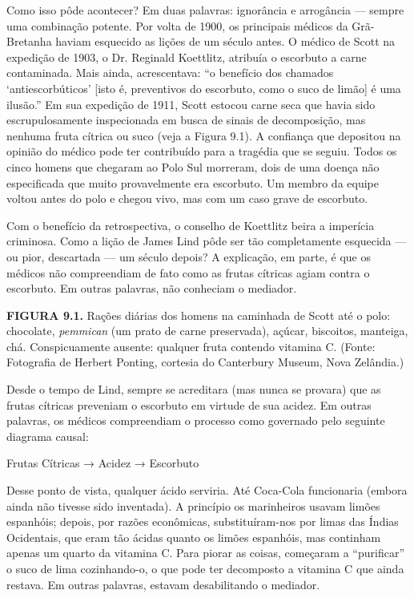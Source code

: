 \documentclass[11pt,a5paper,twoside]{book}
\begin{document}
Como isso pôde acontecer? Em duas palavras: ignorância e arrogância — sempre uma combinação potente. Por volta de 1900, os principais médicos da Grã-Bretanha haviam esquecido as lições de um século antes. O médico de Scott na expedição de 1903, o Dr. Reginald Koettlitz, atribuía o escorbuto a carne contaminada. Mais ainda, acrescentava: “o benefício dos chamados ‘antiescorbúticos’ [isto é, preventivos do escorbuto, como o suco de limão] é uma ilusão.” Em sua expedição de 1911, Scott estocou carne seca que havia sido escrupulosamente inspecionada em busca de sinais de decomposição, mas nenhuma fruta cítrica ou suco (veja a Figura 9.1). A confiança que depositou na opinião do médico pode ter contribuído para a tragédia que se seguiu. Todos os cinco homens que chegaram ao Polo Sul morreram, dois de uma doença não especificada que muito provavelmente era escorbuto. Um membro da equipe voltou antes do polo e chegou vivo, mas com um caso grave de escorbuto.

Com o benefício da retrospectiva, o conselho de Koettlitz beira a imperícia criminosa. Como a lição de James Lind pôde ser tão completamente esquecida — ou pior, descartada — um século depois? A explicação, em parte, é que os médicos não compreendiam de fato como as frutas cítricas agiam contra o escorbuto. Em outras palavras, não conheciam o mediador.

\textbf{FIGURA 9.1.} Rações diárias dos homens na caminhada de Scott até o polo: chocolate, \textit{pemmican} (um prato de carne preservada), açúcar, biscoitos, manteiga, chá. Conspicuamente ausente: qualquer fruta contendo vitamina C. (Fonte: Fotografia de Herbert Ponting, cortesia do Canterbury Museum, Nova Zelândia.)

Desde o tempo de Lind, sempre se acreditara (mas nunca se provara) que as frutas cítricas preveniam o escorbuto em virtude de sua acidez. Em outras palavras, os médicos compreendiam o processo como governado pelo seguinte diagrama causal:

Frutas Cítricas → Acidez → Escorbuto

Desse ponto de vista, qualquer ácido serviria. Até Coca-Cola funcionaria (embora ainda não tivesse sido inventada). A princípio os marinheiros usavam limões espanhóis; depois, por razões econômicas, substituíram-nos por limas das Índias Ocidentais, que eram tão ácidas quanto os limões espanhóis, mas continham apenas um quarto da vitamina C. Para piorar as coisas, começaram a “purificar” o suco de lima cozinhando-o, o que pode ter decomposto a vitamina C que ainda restava. Em outras palavras, estavam desabilitando o mediador.
\end{document}
